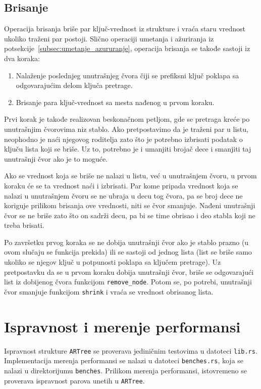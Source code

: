 \documentclass[12pt,oneside]{memoir}
\begin{document}
\subsection{Brisanje}
Operacija brisanja briše par ključ-vrednost iz strukture
i vraća staru vrednost ukoliko traženi par postoji.
Slično operaciji umetanja i ažuriranja iz
potsekcije~\ref{subsec:umetanje_azururanje}, operacija brisanja se
takođe sastoji iz dva koraka:

\begin{enumerate}
  \item Nalaženje poslednjeg unutrašnjeg čvora čiji se prefiksni ključ
        poklapa sa odgovarajućim delom ključa pretrage.
  \item Brisanje para ključ-vrednost sa mesta nađenog u prvom koraku.
\end{enumerate}

Prvi korak je takođe realizovan beskonačnom petljom, gde se pretraga
kreće po unutrašnjim čvorovima niz stablo. Ako pretpostavimo da je
traženi par u listu, neophodno je naći njegovog roditelja zato što
je potrebno izbrisati podatak o ključu lista koji se briše.
Uz to, potrebno je i umanjiti brojač dece i smanjiti taj
unutrašnji čvor ako je to moguće.

Ako se vrednost koja se briše
ne nalazi u listu, već u unutrašnjem čvoru, u prvom koraku
će se ta vrednost naći i izbrisati.
Par kome pripada vrednost koja se nalazi u unutrašnjem čvoru
se ne ubraja u decu tog čvora,
pa se broj dece ne koriguje prilikom brisanja ove vrednosti, niti
se čvor smanjuje.
Nađeni unutrašnji čvor se ne briše zato što on sadrži
decu, pa bi se time obrisao i deo stabla koji ne treba
brisati.

Po završetku prvog koraka se ne dobija unutrašnji čvor ako je
stablo prazno (u ovom slučaju se funkcija prekida) ili se
sastoji od jednog lista (list se briše samo ukoliko se njegov ključ
u potpunosti poklapa sa ključem pretrage). Uz pretpostavku da se u prvom
koraku dobija unutrašnji čvor, briše se odgovarajući list iz dobijenog
čvora funkcijom \texttt{remove\_node}. Potom se, po potrebi,
unutrašnji čvor smanjuje funkcijom \texttt{shrink}
i vraća se vrednost obrisanog lista.

\section{Ispravnost i merenje performansi}

Ispravnost strukture \texttt{ARTree} se
proverava jediničnim testovima u datoteci \texttt{lib.rs}.
Implementacija merenja performansi se nalazi u
datoteci \texttt{benches.rs}, koja se nalazi u
direktorijumu \texttt{benches}.
Prilikom merenja performansi, istovremeno se proverava
ispravnost parova unetih u \texttt{ARTree}.
\end{document}

